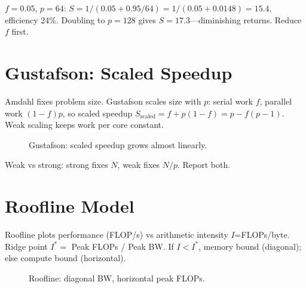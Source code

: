 \begin{example} $f=0.05$, $p=64$: $S=1/(0.05+0.95/64)=1/(0.05+0.0148)=15.4$, efficiency $24\%$. Doubling to $p=128$ gives $S=17.3$—diminishing returns. Reduce $f$ first.
\end{example}

\section{Gustafson: Scaled Speedup}\label{sec:gustafson}
Amdahl fixes problem size. Gustafson scales size with $p$: serial work $f$, parallel work $(1-f)p$, so scaled speedup $S_{\text{scaled}}=f+p(1-f)=p-f(p-1)$. Weak scaling keeps work per core constant.

\begin{figure}[h]\centering
{}
\caption{Gustafson: scaled speedup grows almost linearly.}
\label{fig:gustafson}
\end{figure}

Weak vs strong: strong fixes $N$, weak fixes $N/p$. Report both.

\section{Roofline Model}\label{sec:roofline}
Roofline plots performance (FLOP/s) vs arithmetic intensity $I$=FLOPs/byte. Ridge point $I^*=$ Peak FLOPs / Peak BW. If $I<I^*$, memory bound (diagonal); else compute bound (horizontal).

\begin{figure}[h]\centering
{}
\caption{Roofline: diagonal BW, horizontal peak FLOPs.}
\label{fig:roofline}
\end{figure}


